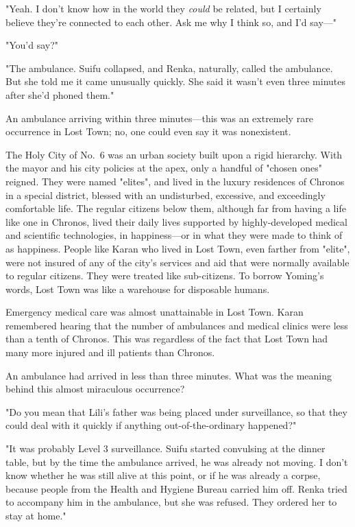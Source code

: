 "Yeah. I don't know how in the world they \emph{could} be related, but I
certainly believe they're connected to each other. Ask me why I think
so, and I'd say---"

"You'd say?"

"The ambulance. Suifu collapsed, and Renka, naturally, called the
ambulance. But she told me it came unusually quickly. She said it wasn't
even three minutes after she'd phoned them."

An ambulance arriving within three minutes---this was an extremely rare
occurrence in Lost Town; no, one could even say it was nonexistent.

The Holy City of No.~6 was an urban society built upon a rigid
hierarchy. With the mayor and his city policies at the apex, only a
handful of "chosen ones" reigned. They were named "elites", and lived in
the luxury residences of Chronos in a special district, blessed with an
undisturbed, excessive, and exceedingly comfortable life. The regular
citizens below them, although far from having a life like one in
Chronos, lived their daily lives supported by highly-developed medical
and scientific technologies, in happiness---or in what they were made to
think of as happiness. People like Karan who lived in Lost Town, even
farther from "elite", were not insured of any of the city's services and
aid that were normally available to regular citizens. They were treated
like sub-citizens. To borrow Yoming's words, Lost Town was like a
warehouse for disposable humans.

Emergency medical care was almost unattainable in Lost Town. Karan
remembered hearing that the number of ambulances and medical clinics
were less than a tenth of Chronos. This was regardless of the fact that
Lost Town had many more injured and ill patients than Chronos.

An ambulance had arrived in less than three minutes. What was the
meaning behind this almost miraculous occurrence?

"Do you mean that Lili's father was being placed under surveillance, so
that they could deal with it quickly if anything out-of-the-ordinary
happened?"

"It was probably Level 3 surveillance. Suifu started convulsing at the
dinner table, but by the time the ambulance arrived, he was already not
moving. I don't know whether he was still alive at this point, or if he
was already a corpse, because people from the Health and Hygiene Bureau
carried him off. Renka tried to accompany him in the ambulance, but she
was refused. They ordered her to stay at home."

